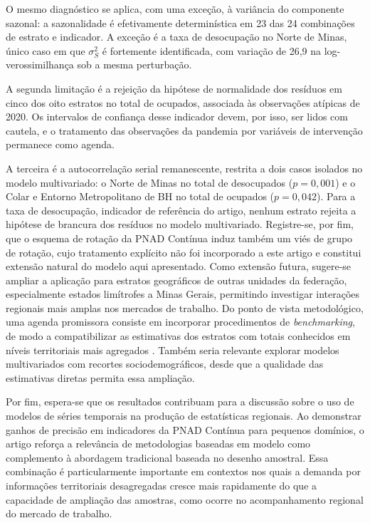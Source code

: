 \documentclass[rbe,wwwview]{econbr}
\begin{document}
O mesmo diagnóstico se aplica, com uma exceção, à variância do componente sazonal: a sazonalidade é efetivamente determinística em 23 das 24 combinações de estrato e indicador. A exceção é a taxa de desocupação no Norte de Minas, único caso em que \(\sigma_S^2\) é fortemente identificada, com variação de 26,9 na log-verossimilhança sob a mesma perturbação.

A segunda limitação é a rejeição da hipótese de normalidade dos resíduos em cinco dos oito estratos no total de ocupados, associada às observações atípicas de 2020. Os intervalos de confiança desse indicador devem, por isso, ser lidos com cautela, e o tratamento das observações da pandemia por variáveis de intervenção permanece como agenda.

A terceira é a autocorrelação serial remanescente, restrita a dois casos isolados no modelo multivariado: o Norte de Minas no total de desocupados (\(p=0{,}001\)) e o Colar e Entorno Metropolitano de BH no total de ocupados (\(p=0{,}042\)). Para a taxa de desocupação, indicador de referência do artigo, nenhum estrato rejeita a hipótese de brancura dos resíduos no modelo multivariado. Registre-se, por fim, que o esquema de rotação da PNAD Contínua induz também um viés de grupo de rotação, cujo tratamento explícito não foi incorporado a este artigo e constitui extensão natural do modelo aqui apresentado.
Como extensão futura, sugere-se ampliar a aplicação para estratos geográficos de outras unidades da federação, especialmente estados limítrofes a Minas Gerais, permitindo investigar interações regionais mais amplas nos mercados de trabalho. Do ponto de vista metodológico, uma agenda promissora consiste em incorporar procedimentos de \textit{benchmarking}, de modo a compatibilizar as estimativas dos estratos com totais conhecidos em níveis territoriais mais agregados \citep{pfeffermann2006}. Também seria relevante explorar modelos multivariados com recortes sociodemográficos, desde que a qualidade das estimativas diretas permita essa ampliação.

Por fim, espera-se que os resultados contribuam para a discussão sobre o uso de modelos de séries temporais na produção de estatísticas regionais. Ao demonstrar ganhos de precisão em indicadores da PNAD Contínua para pequenos domínios, o artigo reforça a relevância de metodologias baseadas em modelo como complemento à abordagem tradicional baseada no desenho amostral. Essa combinação é particularmente importante em contextos nos quais a demanda por informações territoriais desagregadas cresce mais rapidamente do que a capacidade de ampliação das amostras, como ocorre no acompanhamento regional do mercado de trabalho.
\end{document}
